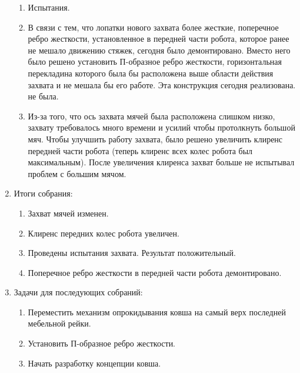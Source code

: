 \begin{enumerate}
\begin{enumerate}
		\item Испытания.
		
		\item В связи с тем, что лопатки нового захвата более жесткие, поперечное ребро жесткости, установленное в передней части робота, которое ранее не мешало движению стяжек, сегодня было демонтировано. Вместо него было решено установить П-образное ребро жесткости, горизонтальная перекладина которого была бы расположена выше области действия захвата и не мешала бы его работе. Эта конструкция сегодня реализована. не была.
		
		\item Из-за того, что ось захвата мячей была расположена слишком низко, захвату требовалось много времени и усилий чтобы протолкнуть большой мяч. Чтобы улучшить работу захвата, было решено увеличить клиренс передней части робота (теперь клиренс всех колес робота был максимальным). После увеличения клиренса захват больше не испытывал проблем с большим мячом.
		
		
	\end{enumerate}
	
	\item Итоги собрания: 
	\begin{enumerate}
		\item Захват мячей изменен.
		
		\item Клиренс передних колес робота увеличен.
		
		\item Проведены испытания захвата. Результат положительный.
		
		\item Поперечное ребро жесткости в передней части робота демонтировано.
		
	\end{enumerate}
	
	\item Задачи для последующих собраний:
	\begin{enumerate}
		\item Переместить механизм опрокидывания ковша на самый верх последней мебельной рейки.
		
		\item Установить П-образное ребро жесткости.
		
		\item Начать разработку концепции ковша.
		
	\end{enumerate}     
\end{enumerate}
\fillpage
